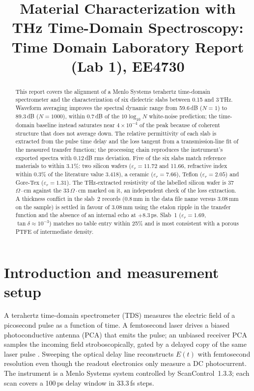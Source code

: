 \documentclass[conference]{IEEEtran}
\title{Material Characterization with THz Time-Domain Spectroscopy:\\
Time Domain Laboratory Report (Lab 1), EE4730}
\author{\IEEEauthorblockN{Daniel Tyukov}
\IEEEauthorblockA{Student number 5714699 \\
Department of Microelectronics, TU Delft \\
d.a.tyukov@student.tudelft.nl}}
\begin{document}
\maketitle

\begin{abstract}
This report covers the alignment of a Menlo Systems terahertz time-domain spectrometer and the characterization of six dielectric slabs between 0.15 and 3\,THz. Waveform averaging improves the spectral dynamic range from 59.6\,dB ($N=1$) to 89.3\,dB ($N=1000$), within 0.7\,dB of the $10\log_{10}N$ white-noise prediction; the time-domain baseline instead saturates near $4\times10^{-4}$ of the peak because of coherent structure that does not average down. The relative permittivity of each slab is extracted from the pulse time delay and the loss tangent from a transmission-line fit of the measured transfer function; the processing chain reproduces the instrument's exported spectra with 0.12\,dB rms deviation. Five of the six slabs match reference materials to within 3.1\%: two silicon wafers ($\varepsilon_r = 11.72$ and 11.66, refractive index within 0.3\% of the literature value 3.418), a ceramic ($\varepsilon_r = 7.66$), Teflon ($\varepsilon_r = 2.05$) and Gore-Tex ($\varepsilon_r = 1.31$). The THz-extracted resistivity of the labelled silicon wafer is 37\,$\Omega\cdot$cm against the 33\,$\Omega\cdot$cm marked on it, an independent check of the loss extraction. A thickness conflict in the slab~2 records (0.8\,mm in the data file name versus 3.08\,mm on the sample) is settled in favour of 3.08\,mm using the etalon ripple in the transfer function and the absence of an internal echo at $+8.3$\,ps. Slab~1 ($\varepsilon_r = 1.69$, $\tan\delta \approx 10^{-3}$) matches no table entry within 25\% and is most consistent with a porous PTFE of intermediate density.
\end{abstract}

\section{Introduction and measurement setup}
A terahertz time-domain spectrometer (TDS) measures the electric field of a picosecond pulse as a function of time. A femtosecond laser drives a biased photoconductive antenna (PCA) that emits the pulse; an unbiased receiver PCA samples the incoming field stroboscopically, gated by a delayed copy of the same laser pulse \cite{labman,jepsen}. Sweeping the optical delay line reconstructs $E(t)$ with femtosecond resolution even though the readout electronics only measure a DC photocurrent. The instrument is a Menlo Systems system controlled by ScanControl~1.3.3; each scan covers a 100\,ps delay window in 33.3\,fs steps.
\end{document}
